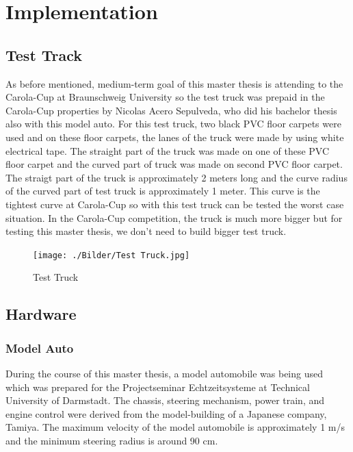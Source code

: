 %
\chapter{Implementation}\label{cha:Implementation}
%
\section{Test Track}\label{sec:Test Track}

As before mentioned, medium-term goal of this master thesis is attending to the Carola-Cup at Braunschweig University 
so the test truck was prepaid in the Carola-Cup properties by Nicolas Acero Sepulveda, who did his bachelor thesis also
with this model auto. For this test truck, two black PVC floor carpets were used and on these floor carpets, the lanes 
of the truck were made by using white electrical tape. The straight part of the truck was made on one of these PVC 
floor carpet and the curved part of truck was made on second PVC floor carpet. The straigt part of the truck is 
approximately 2 meters long and the curve radius of the curved part of test truck is approximately 1 meter. This curve 
is the tightest curve at Carola-Cup so with this test truck can be tested the worst case situation. In the Carola-Cup 
competition, the truck is much more bigger but for testing this master thesis, we don't need to build bigger test truck.

\begin{figure}[H]
	\centering
	\hspace*{0cm}   
	\texttt{[image: ./Bilder/Test Truck.jpg]}
	\caption{Test Truck}
\end{figure}

%
\section{Hardware}\label{sec:Hardware}



%
\subsection{Model Auto}\label{sec:Model Auto}


During the course of this master thesis, a model automobile was being used which was prepared for the Projectseminar 
Echtzeitsysteme at Technical University of Darmstadt. The chassis, steering mechanism, power train, and engine control 
were derived from the model-building of a Japanese company, Tamiya. The maximum velocity of the model automobile is 
approximately 1 m/s and the minimum steering radius is around 90 cm. 

